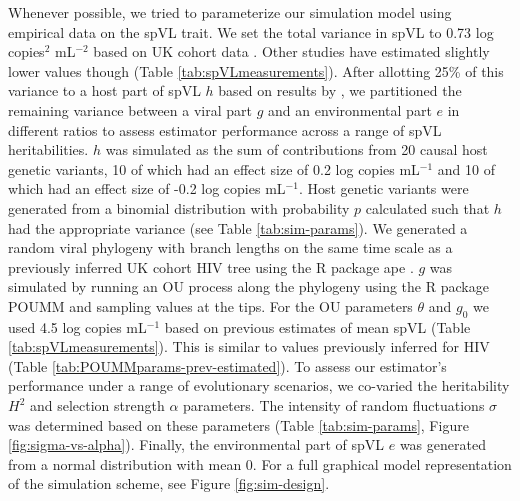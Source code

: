 \documentclass[11pt]{article}
\begin{document}
\begin{linenumbers}
Whenever possible, we tried to parameterize our simulation model using empirical data on the spVL trait. We set the total variance in spVL to 0.73 log copies$^2$ mL$^{-2}$ based on UK cohort data \citep{Mitov2018}. Other studies have estimated slightly lower values though (Table \ref{tab:spVLmeasurements}). After allotting 25\% of this variance to a host part of spVL $h$ based on results by \citet{McLaren2015}, we partitioned the remaining variance between a viral part $g$ and an environmental part $e$ in different ratios to assess estimator performance across a range of spVL heritabilities. $h$ was simulated as the sum of contributions from 20 causal host genetic variants, 10 of which had an effect size of 0.2 log copies mL$^{-1}$ and 10 of which had an effect size of -0.2 log copies mL$^{-1}$. Host genetic variants were generated from a binomial distribution with probability $p$ calculated such that $h$ had the appropriate variance (see Table \ref{tab:sim-params}). We generated a random viral phylogeny with branch lengths on the same time scale as a previously inferred UK cohort HIV tree \citep{Hodcroft2014} using the R package ape \citep{Paradis2018}. $g$ was simulated by running an OU process along the phylogeny using the R package POUMM \citep{Mitov2017a-POUMM} and sampling values at the tips. For the OU parameters $\theta$ and $g_{0}$ we used 4.5 log copies mL$^{-1}$ based on previous estimates of mean spVL (Table \ref{tab:spVLmeasurements}). This is similar to values previously inferred for HIV (Table \ref{tab:POUMMparams-prev-estimated}). To assess our estimator's performance under a range of evolutionary scenarios, we co-varied the heritability $H^2$ and selection strength $\alpha$ parameters. The intensity of random fluctuations $\sigma$ was determined based on these parameters (Table \ref{tab:sim-params}, Figure \ref{fig:sigma-vs-alpha}). Finally, the environmental part of spVL $e$ was generated from a normal distribution with mean 0.  For a full graphical model representation of the simulation scheme, see Figure \ref{fig:sim-design}. 


\end{linenumbers}
\end{document}
